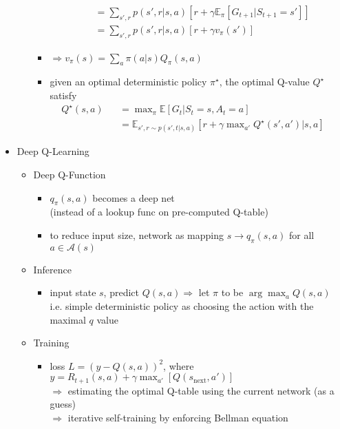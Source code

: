 \begin{itemize}
\begin{itemize}
\begin{itemize}
\begin{align*}
		&= \displaystyle \sum_{s',r} p (s', r|s, a) \left[ r + \gamma {\mathbb E}_\pi \left[ G_{t+1} \big | S_{t+1} = s' \right] \right] \\
		&= \displaystyle \sum_{s',r} p(s',r|s,a)[r + \gamma v_\pi(s')] \end{align*}
		\item $\Rightarrow v_\pi(s) = \sum_a \pi(a|s) Q_\pi(s,a)$
		\item given an optimal deterministic policy $\pi^\star$, the optimal Q-value $Q^\star$ satisfy \\
		$\begin{alignedat}{2} &Q^\star(s,a) &&= \max_{\pi}\mathbb E\left[ G_t | S_t=s, A_t=a \right] \\
		& &&= \mathbb E_{s',r \sim p(s',t|s,a)}\left[r + \gamma \max_{a'}Q^\star(s', a')| s,a\right]
		\end{alignedat}$
		\end{itemize}
	\end{itemize}
\item Deep Q-Learning
	\begin{itemize}
	\item Deep Q-Function
		\begin{itemize}
		\item $q_\pi(s,a)$ becomes a deep net \\
		(instead of a lookup func on pre-computed Q-table) \\
		\item to reduce input size, network as mapping $s\rightarrow q_\pi(s, a)$ for all $a\in \mathcal A(s)$
		\end{itemize}
	\item Inference
		\begin{itemize}
		\item input state $s$, predict $Q(s, a) \Rightarrow$ let $\pi$ to be $\arg\max_{a} Q(s, a)$ \\ 
		i.e. simple deterministic policy as choosing the action with the maximal $q$ value
		\end{itemize}
	\item Training
		\begin{itemize}
		\item loss $L = (y-Q(s, a))^2$, where $y= R_{t+1}(s, a) + \gamma \max_{a'}[Q(s_\text{next}, a')]$ \\
		$\Rightarrow$ estimating the optimal Q-table using the current network (as a guess) \\
		$\Rightarrow$ iterative self-training by enforcing Bellman equation

\end{itemize}
\end{itemize}
\end{itemize}
